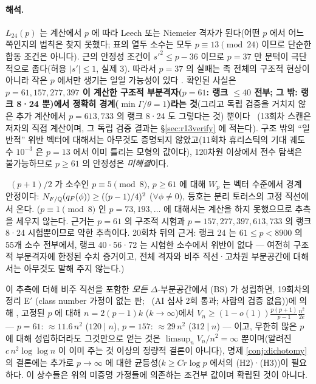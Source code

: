 \paragraph{해석.} $L_{24}(p)$ 는 계산에서 $p$ 에 따라 Leech 또는 Niemeier 격자가 된다(어떤 $p$ 에서 어느 쪽인지의 법칙은 찾지 못했다; 표의 열두 소수는 모두 $p\equiv13\pmod{24}$ 이므로 단순한 합동 조건은 아니다). 근의 안정성 조건이 $s'^2\le p-36$ 이므로 $p=37$ 만 문턱이 극단적으로 좁다(허용 $|s'|\le1$, 실제 3). 따라서 $p=37$ 의 실패는 족 전체의 구조적 현상이 아니라 작은 $p$ 에서만 생기는 일일 가능성이 있다 \tagH. 확인된 사실은 \textbf{$p=61,157,277,397$ 이 계산한 구조적 부분격자($p=61$: 랭크 $\le40$ 전부; 그 밖: 랭크 8·24 뿐)에서 정확히 경계($\min\Gamma/\theta=1$)라는 것}(그리고 독립 검증을 거치지 않은 추가 계산에서 $p=613,733$ 의 랭크 8·24 도 그렇다는 것) 뿐이다 \tagN\ (13회차 스캔은 저자의 직접 계산이며, 그 독립 검증 결과는 \S\ref{sec:r13verify} 에 적는다). 구조 밖의 ``일반적'' 위반 벡터에 대해서는 아무것도 증명되지 않았고(11회차 휴리스틱의 기대 궤도 수 $10^{-3}$ 은 $p=13$ 에서 이미 틀리는 모형의 값이다), 120차원 이상에서 전수 탐색은 불가능하므로 $p\ge61$ 의 안정성은 \emph{미해결}이다.
\begin{conjecture}\tagJ\ $(p+1)/2$ 가 소수인 $p\equiv5\pmod8$, $p\ge61$ 에 대해 $W_p$ 는 벡터 수준에서 경계 안정이다: $N_{F/\mathbb{Q}}(q_F(\phi))\ge((p-1)/4)^2$ ($\forall\phi\ne0$), 등호는 분리 토러스의 고정 직선에서 온다. ($p\equiv1\pmod8$ 인 $p=73,193,\dots$ 에 대해서는 계산을 하지 못했으므로 추측을 세우지 않는다. 근거는 $p=61$ 의 구조적 시험과 $p=157,277,397,613,733$ 의 랭크 8·24 시험뿐이므로 약한 추측이다. 20회차 뒤의 근거: 랭크 24 는 $61\le p<8900$ 의 55개 소수 전부에서, 랭크 40·56·72 는 시험한 소수에서 위반이 없다 --- 여전히 구조적 부분격자에 한정된 수치 증거이고, 전체 격자와 비주 직선·고차원 부분공간에 대해서는 아무것도 말해 주지 않는다.)\end{conjecture}
이 추측에 더해 비주 직선을 포함한 \emph{모든} $\Delta$-부분공간에서 (BS) 가 성립하면, 19회차의 정리 E$'$ (class number 가정이 없는 판; \tagPL\ (AI 심사 2회 통과; 사람의 검증 없음))에 의해 \tagC, 고정된 $p$ 에 대해 $n=2(p-1)k$ ($k\to\infty$)에서 $V_n\ge(1-o(1))\tfrac{p(p+1)}{p-1}\tfrac{n^2}{2e}$ --- $p=61$: $\approx11.6\,n^2$ ($120\mid n$), $p=157$: $\approx29\,n^2$ ($312\mid n$) --- 이고, 무한히 많은 $p$ 에 대해 성립하더라도 그것만으로 얻는 것은 $\limsup_nV_n/n^2=\infty$ 뿐이며(알려진 $c\,n^2\log\log n$ 이 이미 주는 것 이상의 정량적 결론이 아니다), 명제 \ref{conj:dichotomy} 의 결론에는 추가로 $p\to\infty$ 에 대한 균등성($k\ge Cr\log p$ 에서의 (H2)·(H3))이 필요하다. 이 상수들은 위의 미증명 가정들에 의존하는 조건부 값이며 확립된 것이 아니다.


